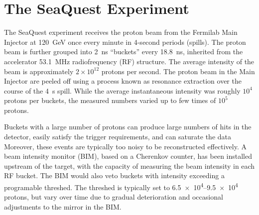 \documentclass[reprint,aps,unsortedaddress,superscriptaddress,prc,floatfix,showpacs,linenumbers,final]{revtex4-2}
\begin{document}
\section{The SeaQuest Experiment}
\label{sec:seaquest_spectrometer}
The SeaQuest experiment receives the  proton beam from the Fermilab Main Injector at \SI{120}{\GeV}
once every minute in 4-second periods (spills).
The proton beam is further grouped into \SI{2}{\ns} ``buckets'' every \SI{18.8}{\ns},
inherited from the accelerator \SI{53.1}{\MHz} radiofrequency (RF) structure.
The average intensity of the beam is approximately $2\times 10^{12}$ protons per second.
The proton beam in the Main Injector are peeled off using a process known as resonance
extraction over the course of the \SI{4}{\second} spill.
While the average instantaneous intensity was roughly $10^4$ protons per buckets,
the measured numbers varied up to few times of $10^5$ protons.

Buckets with a large number of protons can produce large numbers of hits in the detector,
easily satisfy the trigger requirements, and can saturate the data
Moreover, these events are typically too noisy to be reconstructed effectively.
A beam intensity monitor (BIM), based on a Cherenkov counter,
has been installed upstream of the target, with the capacity of measuring the beam intensity in each RF bucket.
The BIM would also veto buckets with intensity exceeding a programable threshed.
The threshed is typically set to \numrange{6.5e4}{9.5e4} protons,
but vary over time due to gradual deterioration and occasional adjustments to the mirror in the BIM.
\end{document}
